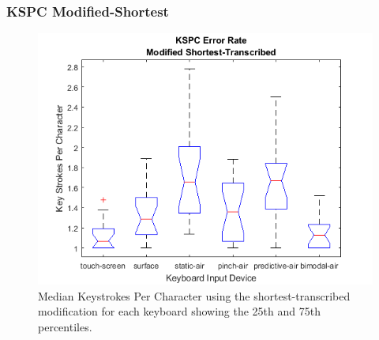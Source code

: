 \subsubsection{KSPC Modified-Shortest}
\begin{figure}[h]
	\centering
	\includegraphics{fig_KSPC_short_boxplot}
	\caption[Keystrokes Per Character Boxplot for Modified-Shortest]{Median Keystrokes Per Character using the shortest-transcribed modification for each keyboard showing the 25th and 75th percentiles.}
	\label{fig_KSPC_short_boxplot}
\end{figure}

